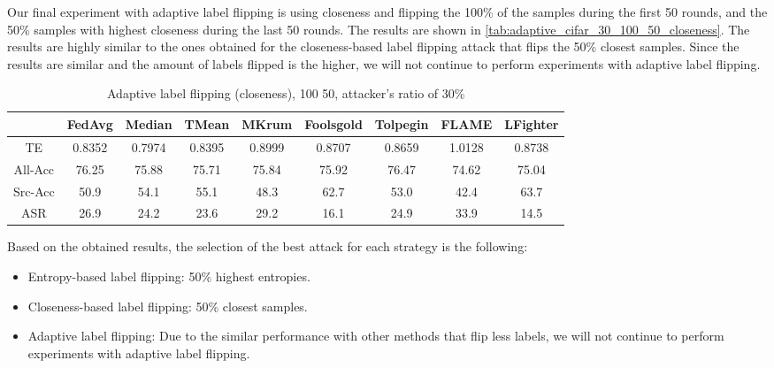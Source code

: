 Our final experiment with adaptive label flipping is using closeness and flipping the 100\% of the samples during the first 50 rounds, and the 50\% samples with highest closeness during the last 50 rounds. The results are shown in \autoref{tab:adaptive_cifar_30_100_50_closeness}. The results are highly similar to the ones obtained for the closeness-based label flipping attack that flips the 50\% closest samples. Since the results are similar and the amount of labels flipped is the higher, we will not continue to perform experiments with adaptive label flipping.
\begin{table}[h!]
        \centering
        \small
        \begin{adjustbox}{center}
        \begin{tabular}{|c|c|c|c|c|c|c|c|c|}
            \hline
            & FedAvg & Median & TMean & MKrum & Foolsgold & Tolpegin & FLAME & LFighter \\
            \hline
            TE & 0.8352 & 0.7974 & 0.8395 & 0.8999 & 0.8707 & 0.8659 & 1.0128 & 0.8738 \\
            \hline
            All-Acc & 76.25 & 75.88 & 75.71 & 75.84 & 75.92 & 76.47 & 74.62 & 75.04 \\
            \hline
            Src-Acc & 50.9 & 54.1 & 55.1 & 48.3 & 62.7 & 53.0 & 42.4 & 63.7 \\
            \hline
            ASR & 26.9 & 24.2 & 23.6 & 29.2 & 16.1 & 24.9 & 33.9 & 14.5 \\
            \hline
        \end{tabular}
        \end{adjustbox}
        \caption{Adaptive label flipping (closeness), 100 50, attacker's ratio of 30\%}
        \label{tab:adaptive_cifar_30_100_50_closeness}
    \end{table}

Based on the obtained results, the selection of the best attack for each strategy is the following:
\begin{itemize}
        \item Entropy-based label flipping: 50\% highest entropies.
        \item Closeness-based label flipping: 50\% closest samples.
        \item Adaptive label flipping: Due to the similar performance with other methods that flip less labels, we will not continue to perform experiments with adaptive label flipping.
\end{itemize}
